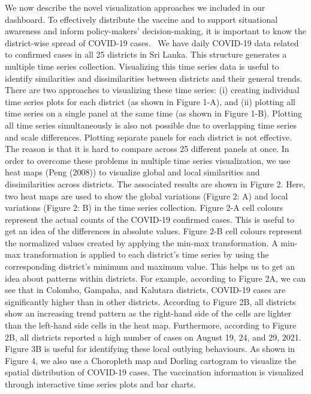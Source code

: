 \documentclass[
]{article}
\begin{document}
We now describe the novel visualization approaches we included in our
dashboard. To effectively distribute the vaccine and to support
situational awareness and inform policy-makers' decision-making, it is
important to know the district-wise spread of COVID-19 cases. ~We have
daily COVID-19 data related to confirmed cases in all 25 districts in
Sri Lanka. This structure generates a multiple time series collection.
Visualizing this time series data is useful to identify similarities and
dissimilarities between districts and their general trends. There are
two approaches to visualizing these time series: (i) creating individual
time series plots for each district (as shown in Figure 1-A), and (ii)
plotting all time series on a single panel at the same time (as shown in
Figure 1-B). Plotting all time series simultaneously is also not
possible due to overlapping time series and scale differences. Plotting
separate panels for each district is not effective. The reason is that
it is hard to compare across 25 different panels at once. In order to
overcome these problems in multiple time series visualization, we use
heat maps (Peng (2008)) to visualize global and local similarities and
dissimilarities across districts. The associated results are shown in
Figure 2. Here, two heat maps are used to show the global variations
(Figure 2: A) and local variations (Figure 2: B) in the time series
collection. Figure 2-A cell colours represent the actual counts of the
COVID-19 confirmed cases. This is useful to get an idea of the
differences in absolute values. Figure 2-B cell colours represent the
normalized values created by applying the min-max transformation. A
min-max transformation is applied to each district's time series by
using the corresponding district's minimum and maximum value. This helps
us to get an idea about patterns within districts. For example,
according to Figure 2A, we can see that in Colombo, Gampaha, and
Kalutara districts, COVID-19 cases are significantly higher than in
other districts. According to Figure 2B, all districts show an
increasing trend pattern as the right-hand side of the cells are lighter
than the left-hand side cells in the heat map. Furthermore, according to
Figure 2B, all districts reported a high number of cases on August 19,
24, and 29, 2021. Figure 3B is useful for identifying these local
outlying behaviours. As shown in Figure 4, we also use a Choropleth map
and Dorling cartogram to visualize the spatial distribution of COVID-19
cases. The vaccination information is visualized through interactive
time series plots and bar charts.
\end{document}
